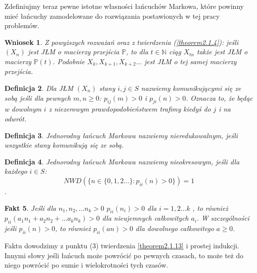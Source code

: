 \documentclass[a4paper]{article}
\theoremstyle{defn}
\newtheorem{defn}{Definicja}[subsection]
\theoremstyle{theorem}
\theoremstyle{lemma}
\theoremstyle{cor}
\newtheorem{cor}[defn]{Wniosek}
\theoremstyle{fact}
\newtheorem{fact}[defn]{Fakt}
\begin{document}
Zdefiniujmy teraz pewne istotne własności łańcuchów Markowa, które powinny mieć łańcuchy zamodelowane do rozwiązania postawionych w tej pracy problemów.
\begin{cor}\label{cor2.1.14}
Z powyższych rozważań oraz z twierdzenia (\ref{theorem2.1.4}): jeśli $(X_n)$ jest JŁM o macierzy przejścia $\mathbb{P}$, to dla $t \in \mathbb{N}$ ciąg $X_{tn}$ także jest JŁM o macierzy $\mathbb{P}(t)$. Podobnie $X_{k}, X_{k+1}, X_{k+2}...$ jest JŁM o tej samej macierzy przejścia.
\end{cor}
\begin{defn}\label{defn2.1.15}
Dla JŁM $(X_n)$ stany $i,j \in S$ nazwiemy \textit{komunikującymi się ze sobą} jeśli dla pewnych $m,n \geq 0$: $p_{ij}(m) > 0$ i $p_{ji}(n) > 0$.
Oznacza to, że będąc w dowolnym $i$ z niezerowym prawdopodobieństwem trafimy kiedyś do $j$ i na odwrót.
\end{defn}
\begin{defn}\label{defn2.1.16}
Jednorodny łańcuch Markowa nazwiemy nieredukowalnym, jeśli wszystkie stany komunikują się ze sobą.
\end{defn}
\begin{defn}\label{defn2.1.17}
Jednorodny łańcuch Markowa nazwiemy nieokresowym, jeśli dla każdego $i \in S$: $$NWD(\{n \in \{0, 1, 2...\}:  p_{ii}(n) > 0\}) = 1$$.
\end{defn}
\begin{fact}\label{fact2.1.18}
Jeśli dla $n_1, n_2, ... n_k > 0$ $p_{ii}(n_i) > 0$ dla $i=1,2...k$ , to również $p_{ii}(a_1n_1 + a_2n_2 + ... a_kn_k) > 0$ dla nieujemnych całkowitych $a_i$. W szczególności jeśli $p_{ii}(n) > 0$, to również $p_{ii}(an) > 0$ dla dowolnego całkowitego $a \geq 0$.
\end{fact}
Faktu dowodzimy z punktu (3) twierdzenia \ref{theorem2.1.13} i prostej indukcji. Innymi słowy jeśli łańcuch może powrócić po pewnych czasach, to może też do niego powrócić po sumie i wielokrotności tych czasów.
\end{document}
